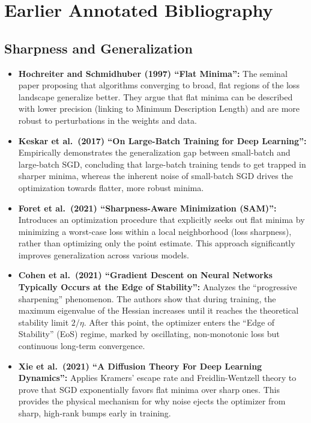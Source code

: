 \documentclass{article}
\begin{document}
\section{Earlier Annotated Bibliography}

\subsection*{Sharpness and Generalization}
\begin{itemize}
    \item \textbf{\cite{hochreiter1997flat} Hochreiter and Schmidhuber (1997) ``Flat Minima'':} The seminal paper proposing that algorithms converging to broad, flat regions of the loss landscape generalize better. They argue that flat minima can be described with lower precision (linking to Minimum Description Length) and are more robust to perturbations in the weights and data.
    \item \textbf{\cite{keskar2017large} Keskar et al.\ (2017) ``On Large-Batch Training for Deep Learning'':} Empirically demonstrates the generalization gap between small-batch and large-batch SGD, concluding that large-batch training tends to get trapped in sharper minima, whereas the inherent noise of small-batch SGD drives the optimization towards flatter, more robust minima.
    \item \textbf{\cite{foret2021sharpnessaware} Foret et al.\ (2021) ``Sharpness-Aware Minimization (SAM)'':} Introduces an optimization procedure that explicitly seeks out flat minima by minimizing a worst-case loss within a local neighborhood (loss sharpness), rather than optimizing only the point estimate. This approach significantly improves generalization across various models.
    \item \textbf{\cite{cohen2021gradient} Cohen et al.\ (2021) ``Gradient Descent on Neural Networks Typically Occurs at the Edge of Stability'':} Analyzes the ``progressive sharpening'' phenomenon. The authors show that during training, the maximum eigenvalue of the Hessian increases until it reaches the theoretical stability limit $2/\eta$. After this point, the optimizer enters the ``Edge of Stability'' (EoS) regime, marked by oscillating, non-monotonic loss but continuous long-term convergence.
    \item \textbf{\cite{xie2020diffusion} Xie et al.\ (2021) ``A Diffusion Theory For Deep Learning Dynamics'':} Applies Kramers' escape rate and Freidlin-Wentzell theory to prove that SGD exponentially favors flat minima over sharp ones. This provides the physical mechanism for why noise ejects the optimizer from sharp, high-rank bumps early in training.
\end{itemize}
\end{document}
